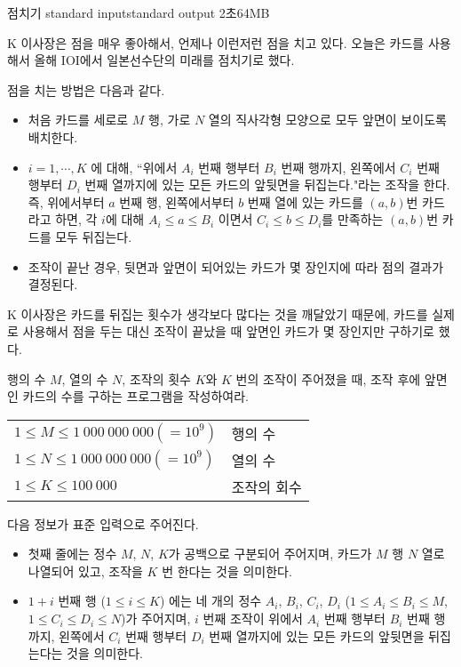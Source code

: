 \begin{problem}{점치기}
	{standard input}{standard output}
	{2초}{64MB}{}
	
	K 이사장은 점을 매우 좋아해서, 언제나 이런저런 점을 치고 있다. 오늘은 카드를 사용해서 올해 IOI에서 일본선수단의 미래를 점치기로 했다.
	
	점을 치는 방법은 다음과 같다.
	
	\begin{itemize}
		\item 처음 카드를 세로로 $M$ 행, 가로 $N$ 열의 직사각형 모양으로 모두 앞면이 보이도록 배치한다.
		\item $i = 1, \cdots, K$ 에 대해, ``위에서 $A_i$ 번째 행부터 $B_i$ 번째 행까지, 왼쪽에서 $C_i$ 번째 행부터 $D_i$ 번째 열까지에 있는 모든 카드의 앞뒷면을 뒤집는다."라는 조작을 한다. 즉, 위에서부터 $a$ 번째 행, 왼쪽에서부터 $b$ 번째 열에 있는 카드를 $(a, b)$번 카드라고 하면, 각 $i$에 대해 $A_i \le a \le B_i$ 이면서 $C_i \le b \le D_i$를 만족하는 $(a, b)$번 카드를 모두 뒤집는다.
		\item 조작이 끝난 경우, 뒷면과 앞면이 되어있는 카드가 몇 장인지에 따라 점의 결과가 결정된다.
	\end{itemize}

	K 이사장은 카드를 뒤집는 횟수가 생각보다 많다는 것을 깨달았기 때문에, 카드를 실제로 사용해서 점을 두는 대신 조작이 끝났을 때 앞면인 카드가 몇 장인지만 구하기로 했다.

	행의 수 $M$, 열의 수 $N$, 조작의 횟수 $K$와 $K$ 번의 조작이 주어졌을 때, 조작 후에 앞면인 카드의 수를 구하는 프로그램을 작성하여라.
	
	
	\Constraints
	

\begin{tabular}{ll}
	$1 \le M \le 1\ 000\ 000\ 000 (=10^9)$ & 행의 수 \\
	$1 \le N \le 1\ 000\ 000\ 000 (=10^9)$ & 열의 수 \\
	$1 \le K \le 100\ 000$ & 조작의 회수
\end{tabular}


	\InputFile
	
	다음 정보가 표준 입력으로 주어진다.
	
	\begin{itemize}
		\item 첫째 줄에는 정수 $M$, $N$, $K$가 공백으로 구분되어 주어지며, 카드가 $M$ 행 $N$ 열로 나열되어 있고, 조작을 $K$ 번 한다는 것을 의미한다.
		\item $1+i$ 번째 행 ($1 \le i \le K$) 에는 네 개의 정수 $A_i$, $B_i$, $C_i$, $D_i$ ($1 \le A_i \le B_i \le M$, $1 \le C_i \le D_i \le N$)가 주어지며, $i$ 번째 조작이 위에서 $A_i$ 번째 행부터 $B_i$ 번째 행까지, 왼쪽에서 $C_i$ 번째 행부터 $D_i$ 번째 열까지에 있는 모든 카드의 앞뒷면을 뒤집는다는 것을 의미한다.
	\end{itemize}



\end{problem}
